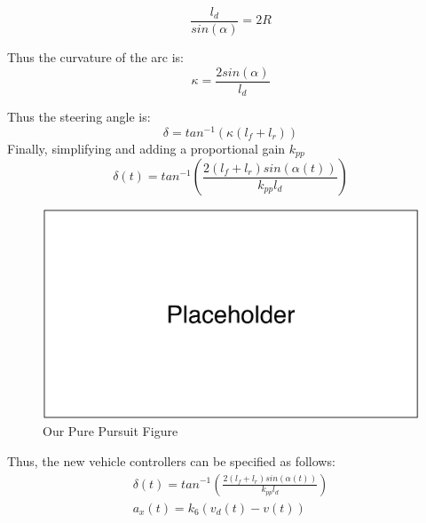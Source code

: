 \begin{equation}
	\frac{l_d}{sin(\alpha)} = 2R
\end{equation}


Thus the curvature of the arc is:
\begin{equation}
	\kappa = \frac{2sin(\alpha)}{l_d}
\end{equation}

Thus the steering angle is:
\begin{equation}
	\delta = tan^{-1}(\kappa(l_f +l_r))
\end{equation}
Finally, simplifying and adding a proportional gain $k_{pp}$
\begin{equation}
	\delta(t) = tan^{-1}\left(\frac{2(l_f+l_r)sin(\alpha(t))}{k_{pp}l_d}\right)
\end{equation}


\begin{figure}
	\centering
	\includegraphics[scale=.5]{figures/placeholder}
	\caption{Our Pure Pursuit Figure}
\end{figure}


Thus, the new vehicle controllers can be specified as follows:
\begin{gather}
\delta(t) = tan^{-1}\left(\frac{2(l_f+l_r)sin(\alpha(t))}{k_{pp}l_d}\right)
\\
a_x(t)=k_6(v_d(t)-v(t))
\end{gather}




